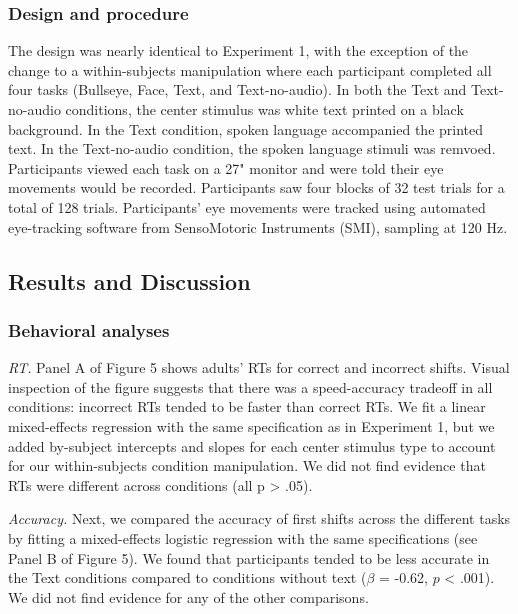 \documentclass[10pt, letterpaper]{article}
\begin{document}
\subsubsection{Design and procedure}\label{design-and-procedure-1}

The design was nearly identical to Experiment 1, with the exception of
the change to a within-subjects manipulation where each participant
completed all four tasks (Bullseye, Face, Text, and Text-no-audio). In
both the Text and Text-no-audio conditions, the center stimulus was
white text printed on a black background. In the Text condition, spoken
language accompanied the printed text. In the Text-no-audio condition,
the spoken language stimuli was remvoed. Participants viewed each task
on a 27" monitor and were told their eye movements would be recorded.
Participants saw four blocks of 32 test trials for a total of 128
trials. Participants' eye movements were tracked using automated
eye-tracking software from SensoMotoric Instruments (SMI), sampling at
120 Hz.

\subsection{Results and Discussion}\label{results-and-discussion-1}

\subsubsection{Behavioral analyses}\label{behavioral-analyses-1}

\emph{RT.} Panel A of Figure 5 shows adults' RTs for correct and
incorrect shifts. Visual inspection of the figure suggests that there
was a speed-accuracy tradeoff in all conditions: incorrect RTs tended to
be faster than correct RTs. We fit a linear mixed-effects regression
with the same specification as in Experiment 1, but we added by-subject
intercepts and slopes for each center stimulus type to account for our
within-subjects condition manipulation. We did not find evidence that
RTs were different across conditions (all p \textgreater{} .05).

\emph{Accuracy.} Next, we compared the accuracy of first shifts across
the different tasks by fitting a mixed-effects logistic regression with
the same specifications (see Panel B of Figure 5). We found that
participants tended to be less accurate in the Text conditions compared
to conditions without text (\(\beta\) = -0.62, \(p\) \textless{} .001).
We did not find evidence for any of the other comparisons.
\end{document}
